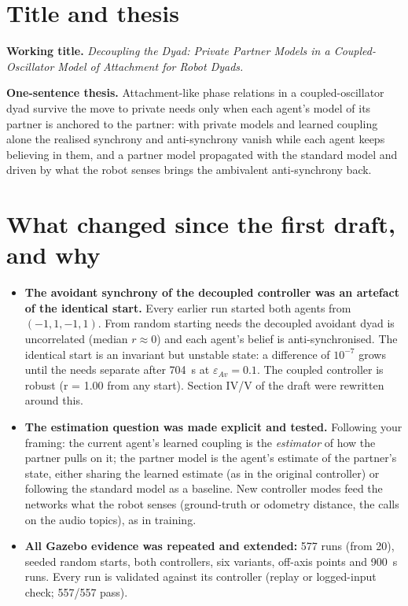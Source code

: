 \documentclass[10pt,a4paper]{article}
\newcommand{\eav}{\varepsilon_{Av}}
\begin{document}
\section{Title and thesis}

\textbf{Working title.} \emph{Decoupling the Dyad: Private Partner Models in a Coupled-Oscillator Model of Attachment for Robot Dyads.}

\textbf{One-sentence thesis.} Attachment-like phase relations in a coupled-oscillator dyad survive the move to private needs only when each agent's model of its partner is anchored to the partner: with private models and learned coupling alone the realised synchrony and anti-synchrony vanish while each agent keeps believing in them, and a partner model propagated with the standard model and driven by what the robot senses brings the ambivalent anti-synchrony back.

\section{What changed since the first draft, and why}
\begin{itemize}
\item \textbf{The avoidant synchrony of the decoupled controller was an artefact of the identical start.} Every earlier run started both agents from $(-1,1,-1,1)$. From random starting needs the decoupled avoidant dyad is uncorrelated (median $r\approx0$) and each agent's belief is anti-synchronised. The identical start is an invariant but unstable state: a difference of $10^{-7}$ grows until the needs separate after 704~s at $\eav=0.1$. The coupled controller is robust (r = 1.00 from any start). Section IV/V of the draft were rewritten around this.
\item \textbf{The estimation question was made explicit and tested.} Following your framing: the current agent's learned coupling is the \emph{estimator} of how the partner pulls on it; the partner model is the agent's estimate of the partner's state, either sharing the learned estimate (as in the original controller) or following the standard model as a baseline. New controller modes feed the networks what the robot senses (ground-truth or odometry distance, the calls on the audio topics), as in training.
\item \textbf{All Gazebo evidence was repeated and extended:} 577 runs (from 20), seeded random starts, both controllers, six variants, off-axis points and 900~s runs. Every run is validated against its controller (replay or logged-input check; 557/557 pass).
\end{itemize}
\end{document}
